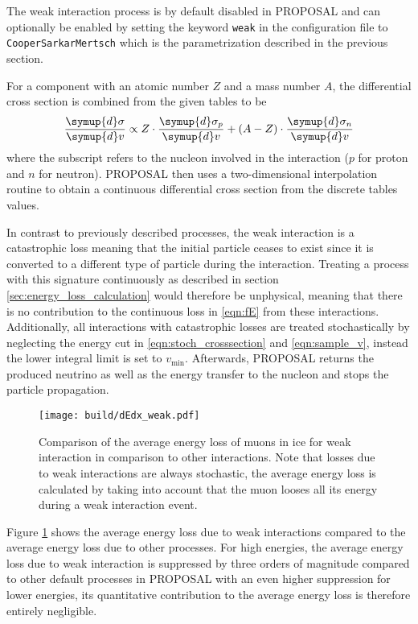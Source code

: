 \begin{sloppypar}
The weak interaction process is by default disabled in PROPOSAL and can optionally be enabled by setting the keyword \texttt{weak} in the configuration file to \texttt{CooperSarkarMertsch} which is the parametrization described in the previous section.
\end{sloppypar}
For a component with an atomic number $Z$ and a mass number $A$, the differential cross section is combined from the given tables to be
%
\begin{equation}
	\frac{\symup{d}\sigma}{\symup{d}v} \propto Z \cdot \frac{\symup{d}\sigma_p}{\symup{d}v} + (A - Z) \cdot \frac{\symup{d}\sigma_n}{\symup{d}v}
\end{equation}
%
where the subscript refers to the nucleon involved in the interaction ($p$ for proton and $n$ for neutron).
PROPOSAL then uses a two-dimensional interpolation routine to obtain a continuous differential cross section from the discrete tables values.

In contrast to previously described processes, the weak interaction is a catastrophic loss meaning that the initial particle ceases to exist since it is converted to a different type of particle during the interaction.
Treating a process with this signature continuously as described in section \ref{sec:energy_loss_calculation} would therefore be unphysical, meaning that there is no contribution to the continuous loss in \eqref{eqn:fE} from these interactions.
Additionally, all interactions with catastrophic losses are treated stochastically by neglecting the energy cut in \eqref{eqn:stoch_crosssection} and \eqref{eqn:sample_v}, instead the lower integral limit is set to $v_{\text{min}}$.
Afterwards, PROPOSAL returns the produced neutrino as well as the energy transfer to the nucleon and stops the particle propagation.

\begin{figure}
    \centering
    \texttt{[image: build/dEdx\_weak.pdf]}
    \caption{Comparison of the average energy loss of muons in ice for weak interaction in comparison to other interactions. Note that losses due to weak interactions are always stochastic, the average energy loss is calculated by taking into account that the muon looses all its energy during a weak interaction event.}
    \label{fig:dEdx_weak}
\end{figure}

Figure \ref{fig:dEdx_weak} shows the average energy loss due to weak interactions compared to the average energy loss due to other processes.
For high energies, the average energy loss due to weak interaction is suppressed by three orders of magnitude compared to other default processes in PROPOSAL with an even higher suppression for lower energies, its quantitative contribution to the average energy loss is therefore entirely negligible.

